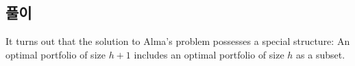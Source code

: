\documentclass[12pt]{article} %
\newif\ifEN
\newtheorem{lemma}{Lemma}
\theoremstyle{definition}
\newtheorem{lemma}{기본정리}
\theoremstyle{definition}
\begin{document}
\ifEN \subsection{Solution}  \else \subsection{풀이} \fi
It turns out that the solution to Alma's problem possesses a special structure: An optimal portfolio of size $h+1$ includes an optimal portfolio of size $h$ as a subset.
%
\end{document}

